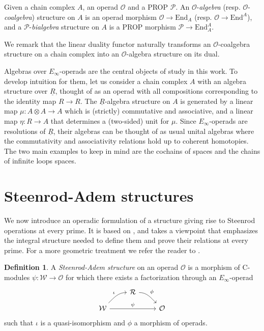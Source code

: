 \documentclass[A4]{amsart}
\theoremstyle{definition}
\newtheorem{definition}[theorem]{Definition}
\newcommand{\End}{\mathrm{End}}
\begin{document}
Given a chain complex $A$, an operad $\mathcal O$ and a PROP $\mathcal P$. An $\mathcal O$-\textit{algebra} (resp. $\mathcal O$-\textit{coalgebra}) structure on $A$ is an operad morphism $\mathcal O \to \End_A$ (resp. $\mathcal O \to \End^A$), and a $\mathcal P$-\textit{bialgebra} structure on $A$ is a PROP morphism $\mathcal P \to \End_A^A$.

We remark that the linear duality functor naturally transforms an $\mathcal O$-coalgebra structure on a chain complex into an $\mathcal O$-algebra structure on its dual.

Algebras over $E_\infty$-operads are the central objects of study in this work. To develop intuition for them, let us consider a chain complex $A$ with an algebra structure over $\underline{R}$, thought of as an operad with all compositions corresponding to the identity map $R \to R$. The $\underline{R}$-algebra structure on $A$ is generated by a linear map $\mu \colon A \otimes A \to A$ which is (strictly) commutative and associative, and a linear map $\eta \colon R \to A$ that determines a (two-sided) unit for $\mu$. Since $E_\infty$-operads are resolutions of $\underline{R}$, their algebras can be thought of as usual unital algebras where the commutativity and associativity relations hold up to coherent homotopies. The two main examples to keep in mind are the cochains of spaces and the chains of infinite loops spaces.	

\section{Steenrod-Adem structures}

We now introduce an operadic formulation of a structure giving rise to Steenrod operations at every prime. It is based on \cites{steenrod47products, steenrod53symmetric, steenrod53cyclic, may70generalapproach}, and takes a viewpoint that emphasizes the integral structure needed to define them and prove their relations at every prime. For a more geometric treatment we refer the reader to \cites{may72geometry, may76homology, lawson2020n}.

\begin{definition} \label{def: Steenrod-Adem structure}
	A \textit{Steenrod-Adem structure} on an operad $\mathcal O$ is a 
	morphism of $\mathrm{C}$-modules $\psi \colon \mathcal W \to \mathcal O$ for which there exists a factorization through an $E_\infty$-operad
	\begin{equation*}
	\begin{tikzcd}[column sep = normal, row sep = small]
	& \mathcal R \arrow[dr, "\phi", out=0] & \\
	\mathcal W \arrow[ur, "\iota", in=180] \arrow[rr, "\psi"] & & \mathcal O
	\end{tikzcd}
	\end{equation*}
	such that $\iota$ is a quasi-isomorphism and $\phi$ a morphism of operads.
\end{definition}
\end{document}
